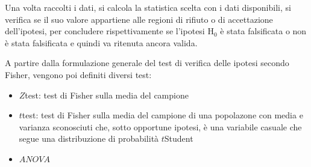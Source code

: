 \documentclass[letterpaper,10pt,italian]{jupyterBook}
\begin{document}
\sphinxAtStartPar
Una volta raccolti i dati, si calcola la statistica scelta con i dati disponibili, si verifica se il suo valore appartiene alle regioni di rifiuto o di accettazione dell’ipotesi, per concludere rispettivamente se l’ipotesi \(\text{H}_{0}\) è stata falsificata o non è stata falsificata e quindi va ritenuta ancora valida.

\sphinxAtStartPar
A partire dalla formulazione generale del test di verifica delle ipotesi secondo Fisher, vengono poi definiti diversi test:
\begin{itemize}
\item {} 
\sphinxAtStartPar
\(Z\)\sphinxhyphen{}test: test di Fisher sulla media del campione

\item {} 
\sphinxAtStartPar
\(t\)\sphinxhyphen{}test: test di Fisher sulla media del campione di una popolazone con media e varianza sconosciuti che, sotto opportune ipotesi, è una variabile casuale che segue una distribuzione di probabilità \(t\)\sphinxhyphen{}Student

\item {} 
\sphinxAtStartPar
\(ANOVA\)

\end{itemize}

\sphinxstepscope
\end{document}
